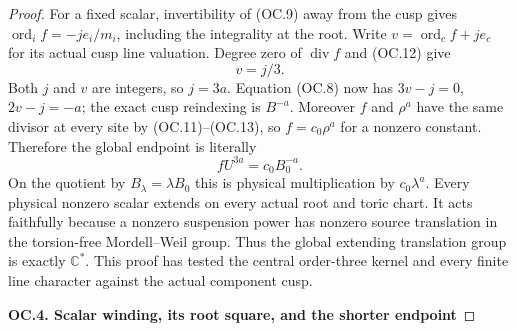 \begin{proof}
For a fixed scalar, invertibility of (OC.9) away from the cusp
gives \(\operatorname{ord}_i f=-je_i/m_i\), including the
integrality at the root. Write
\(v=\operatorname{ord}_c f+je_c\) for its actual cusp line
valuation. Degree zero of \(\operatorname{div}f\) and
(OC.12) give
\[
                              v=j/3.                     \tag{OC.13}
\]
Both \(j\) and \(v\) are integers, so \(j=3a\).
Equation (OC.8) now has \(3v-j=0\), \(2v-j=-a\);
the exact cusp reindexing is \(B^{-a}\). Moreover \(f\)
and \(\rho^a\) have the same divisor at every site by
(OC.11)--(OC.13), so \(f=c_0\rho^a\) for a nonzero
constant. Therefore the global endpoint is literally
\[
                       fU^{3a}=c_0B_0^{-a}.              \tag{OC.14}
\]
On the quotient by \(B_\lambda=\lambda B_0\) this is
physical multiplication by \(c_0\lambda^a\). Every physical
nonzero scalar extends on every actual root and toric chart.
It acts faithfully because a nonzero suspension power has nonzero
source translation in the torsion-free Mordell--Weil group. Thus
the global extending translation group is exactly \(\mathbb C^*\).
This proof has tested the central order-three kernel and every finite
line character against the actual component cusp.

\par

\medskip\noindent\textbf{OC.4. Scalar winding, its root square, and the shorter endpoint}

\par\nobreak


\end{proof}

